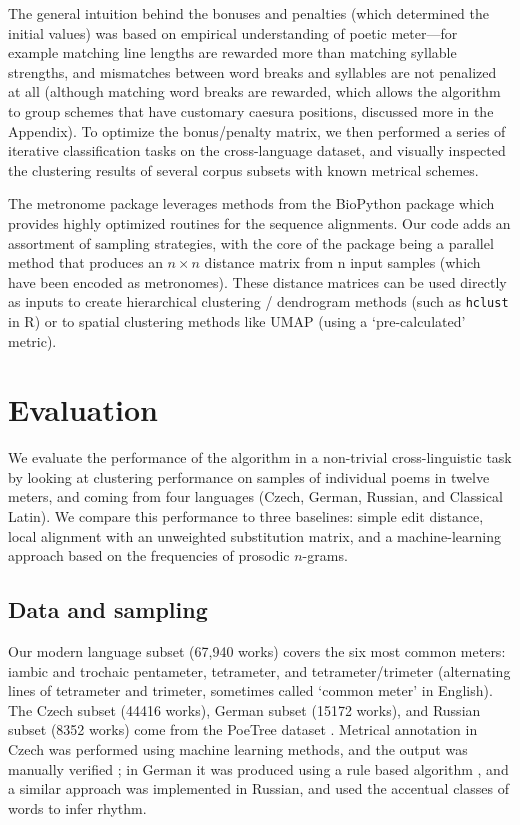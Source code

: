 \documentclass[
    hf
]{ceurart}
\begin{document}
The general intuition behind the bonuses and penalties (which determined the initial values) was based on empirical understanding of poetic meter---for example matching line lengths are rewarded more than matching syllable strengths, and mismatches between word breaks and syllables are not penalized at all (although matching word breaks are rewarded, which allows the algorithm to group schemes that have customary caesura positions, discussed more in the Appendix). To optimize the bonus/penalty matrix, we then performed a series of iterative classification tasks on the cross-language dataset, and visually inspected the clustering results of several corpus subsets with known metrical schemes.

The metronome package leverages methods from the BioPython package \cite{biopython} which provides highly optimized routines for the sequence alignments. Our code adds an assortment of sampling strategies, with the core of the package being a parallel method that produces an $n \times n$ distance matrix from n input samples (which have been encoded as metronomes). These distance matrices can be used directly as inputs to create hierarchical clustering / dendrogram methods (such as \texttt{hclust} in R) or to spatial clustering methods like UMAP (using a `pre-calculated' metric).

\section{Evaluation}

We evaluate the performance of the algorithm in a non-trivial cross-linguistic task by looking at clustering performance on samples of individual poems in twelve meters, and coming from four languages (Czech, German, Russian, and Classical Latin). We compare this performance to three baselines: simple edit distance, local alignment with an unweighted substitution matrix, and a machine-learning approach based on the frequencies of prosodic $n$-grams.

\subsection{Data and sampling}

Our modern language subset (67,940 works) covers the six most common meters: iambic and trochaic pentameter, tetrameter, and tetrameter/trimeter (alternating lines of tetrameter and trimeter, sometimes called `common meter' in English). The Czech subset (44416 works), German subset (15172 works), and Russian subset (8352 works) come from the PoeTree dataset  \cite{plechac_poetree_2023}. Metrical annotation in Czech was performed using machine learning methods, and the output was manually verified  \cite{plechac_czech_2016}; in German it was produced using a rule based algorithm \cite{bobenhausen_metrique_2015}, and a similar approach was implemented in Russian, and used the accentual classes of words to infer rhythm.
\end{document}
